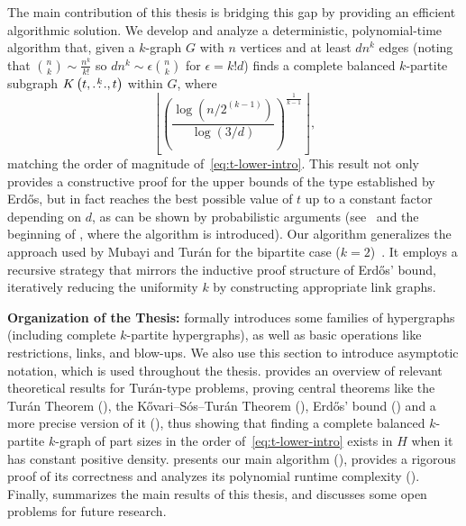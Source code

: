The main contribution of this thesis is bridging this gap by providing an efficient algorithmic solution.
We develop and analyze a deterministic, polynomial-time algorithm that,
given a $k$-graph $G$ with $n$ vertices and at least $dn^k$ edges (noting that $\binom{n}{k} \sim \frac{n^k}{k!}$
so $dn^k \sim \epsilon \binom{n}{k}$ for $\epsilon = k! d$)
finds a complete balanced $k$-partite subgraph $K\left(t, \overset{k}{\dots}, t\right)$ within $G$, where
\[
    \left\lfloor \left(  \frac{\log \left(n/2^{(k-1)}\right)}{\log (3/d)} \right)^{\frac{1}{k-1}} \right\rfloor,
\]
matching the order of magnitude of~\eqref{eq:t-lower-intro}.
This result not only provides a constructive proof for the upper bounds of the type established by Erdős,
but in fact reaches the best possible value of $t$ up to a constant factor depending on $d$, as
can be shown by probabilistic arguments (see~ and
the beginning of , where the algorithm is introduced).
Our algorithm generalizes the approach used by Mubayi and Turán for the bipartite case ($k=2$)~\cite{MUBAYI2010174}.
It employs a recursive strategy that mirrors the inductive proof structure of Erdős' bound,
iteratively reducing the uniformity $k$ by constructing appropriate link graphs.

\textbf{Organization of the Thesis:}
 formally introduces some families of hypergraphs
(including complete $k$-partite hypergraphs),
as well as basic operations like restrictions, links, and blow-ups.
We also use this section to introduce asymptotic notation, which is used throughout the thesis.
 provides an overview of relevant theoretical results for Turán-type problems,
proving central theorems like the Turán Theorem (), the Kővari--Sós--Turán Theorem (),
Erdős' bound () and a more precise version of it (),
thus showing that finding a complete balanced $k$-partite $k$-graph of part sizes in the order of~\eqref{eq:t-lower-intro}
exists in $H$ when it has constant positive density.
 presents our main algorithm (),
provides a rigorous proof of its correctness and analyzes its polynomial runtime complexity ().
Finally,  summarizes the main results of this thesis, and discusses some open problems for future research.
